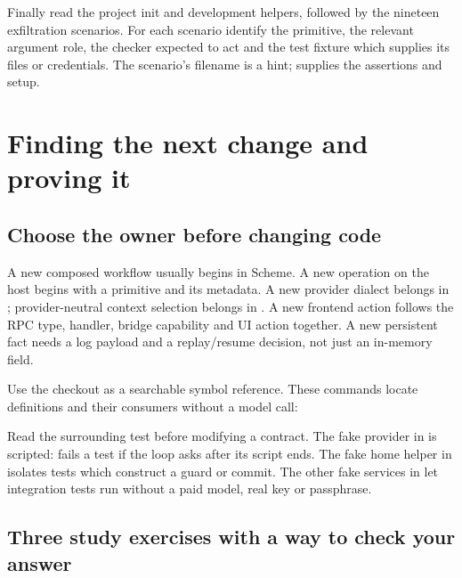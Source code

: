 Finally read the project init and development helpers, followed by the
nineteen exfiltration scenarios. For each scenario identify the primitive,
the relevant argument role, the checker expected to act and the test fixture
which supplies its files or credentials. The scenario's filename is a hint;
 supplies the assertions and setup.

\chapter{Finding the next change and proving it}

\section{Choose the owner before changing code}

A new composed workflow usually begins in Scheme. A new operation on the
host begins with a primitive and its metadata. A new provider dialect
belongs in ; provider-neutral context selection belongs in
. A new frontend action follows the RPC type, handler,
bridge capability and UI action together. A new persistent fact needs a
log payload and a replay/resume decision, not just an in-memory field.

Use the checkout as a searchable symbol reference. These
commands locate definitions and their consumers without a model call:

Read the surrounding test before modifying a contract. The fake provider
in  is scripted:  fails a test
if the loop asks after its script ends. The fake home helper in
 isolates tests which construct a guard or
commit. The other fake services in  let integration tests
run without a paid model, real key or passphrase.

\section{Three study exercises with a way to check your answer}

